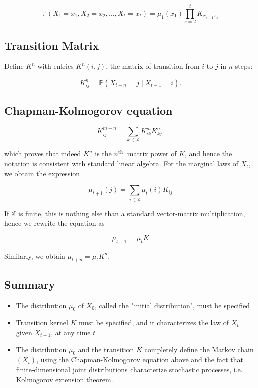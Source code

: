 \documentclass[10pt]{article}
\begin{document}
$$
\mathbb{P}\left(X_{1}=x_{1}, X_{2}=x_{2}, \ldots, X_{t}=x_{t}\right)=\mu_{1}\left(x_{1}\right) \prod_{s=2}^{t} K_{x_{s-1} x_{s}}
$$

\subsection{Transition Matrix}
Define $K^{n}$ with entries $K^{n}(i, j)$, the matrix of transition from $i$ to $j$ in $n$ steps:

$$
K_{i j}^{n}=\mathbb{P}\left(X_{t+n}=j \mid X_{t-1}=i\right) .
$$

 \subsection{Chapman-Kolmogorov equation}

$$
K_{i j}^{m+n}=\sum_{k \in \mathbb{X}} K_{i k}^{m} K_{k j}^{n} .
$$

which proves that indeed $K^{n}$ is the $n^{\text {th }}$ matrix power of $K$, and hence the notation is consistent with standard linear algebra. For the marginal laws of $X_{t}$, we obtain the expression

$$
\mu_{t+1}(j)=\sum_{i \in \mathbb{X}} \mu_{t}(i) K_{i j}
$$

If $\mathbb{X}$ is finite, this is nothing else than a standard vector-matrix multiplication, hence we rewrite the equation as

$$
\mu_{t+1}=\mu_{t} K
$$

Similarly, we obtain $\mu_{t+n}=\mu_{t} K^{n}$.

\subsection{Summary}
\begin{itemize}
    \item The distribution $\mu_{0}$ of $X_{0}$, called the "initial distribution", must be specified
    \item Transition kernel $K$ must be specified, and it characterizes the law of $X_{t}$ given $X_{t-1}$, at any time $t$
    \item The distribution $\mu_{0}$ and the transition $K$ completely define the Markov chain $\left(X_{t}\right)$, using the Chapman-Kolmogorov equation above and the fact that finite-dimensional joint distributions characterize stochastic processes, i.e. Kolmogorov extension theorem.
\end{itemize}
\end{document}
